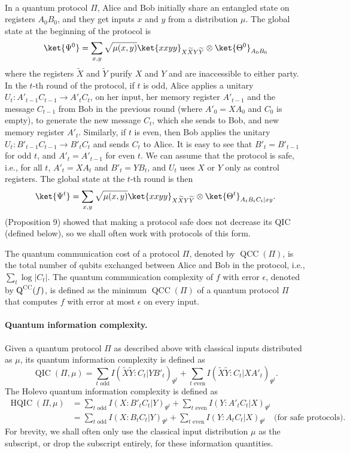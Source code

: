 \documentclass[10pt,a4paper]{article}
\theoremstyle{definition}
\newcommand{\CC}{\textsc{CC}}
\renewcommand{\>}{\rangle}
\newcommand{\<}{\langle}
\newcommand{\tX}{\widetilde{X}}
\newcommand{\tY}{\widetilde{Y}}
\DeclareMathOperator{\Q}{Q}
\DeclareMathOperator{\QCC}{QCC}
\DeclareMathOperator{\QIC}{QIC}
\DeclareMathOperator{\HQIC}{HQIC}
\begin{document}
\paragraph{} In a quantum protocol $\Pi$, Alice and Bob initially share an entangled state on registers $A_0B_0$, and they get inputs $x$ and $y$ from a distribution $\mu$. The global state at the beginning of the protocol is
\[ \ket{\Psi^0} = \sum_{x,y}\sqrt{\mu(x,y)}\ket{xxyy}_{X\tX Y\tY}\otimes\ket{\Theta^0}_{A_0B_0}\]
where the registers $\tX$ and $\tY$ purify $X$ and $Y$ and are inaccessible to either party. In the $t$-th round of the protocol, if $t$ is odd, Alice applies a unitary $U_t: A'_{t-1}C_{t-1} \to A'_tC_t$, on her input, her memory register $A'_{t-1}$ and the message $C_{t-1}$ from Bob in the previous round (where $A'_0=XA_0$ and $C_0$ is empty), to generate the new message $C_t$, which she sends to Bob, and new memory register $A'_t$. Similarly, if $t$ is even, then Bob applies the unitary $U_t: B'_{t-1}C_{t-1} \to B'_tC_t$ and sends $C_t$ to Alice. It is easy to see that $B'_t=B'_{t-1}$ for odd $t$, and $A'_t=A'_{t-1}$ for even $t$. We can assume that the protocol is safe, i.e., for all $t$, $A'_t=XA_t$ and $B'_t = YB_t$, and $U_t$ uses $X$ or $Y$ only as control registers. The global state at the $t$-th round is then
\[ \ket{\Psi^t} = \sum_{x,y}\sqrt{\mu(x,y)}\ket{xxyy}_{X\tX Y\tY}\otimes\ket{\Theta^t}_{A_tB_tC_t|xy}.\]
\cite{LT17} (Proposition 9) showed that making a protocol safe does not decrease its QIC (defined below), so we shall often work with protocols of this form.

The quantum communication cost of a protocol $\Pi$, denoted by $\QCC(\Pi)$, is the total number of qubits exchanged between Alice and Bob in the protocol, i.e., $\sum_t\log|C_t|$. The quantum communication complexity of $f$ with error $\epsilon$, denoted by $\Q^\CC(f)$, is defined as the minimum $\QCC(\Pi)$ of a quantum protocol $\Pi$ that computes $f$ with error at most $\epsilon$ on every input.

\paragraph{Quantum information complexity.} Given a quantum protocol $\Pi$ as described above with classical inputs distributed as $\mu$, its quantum information complexity is defined as
\[ \QIC(\Pi,\mu) = \sum_{t \text{ odd}}I(\tX\tY:C_t|YB'_t)_{\Psi^t} + \sum_{t\text{ even}}I(\tX\tY:C_t|XA'_t)_{\Psi^t}.\]
The Holevo quantum information complexity is defined as
\begin{align*}
\HQIC(\Pi,\mu) & = \sum_{t\text{ odd}}I(X:B'_tC_t|Y)_{\Psi^t} + \sum_{t\text{ even}}I(Y:A'_tC_t|X)_{\Psi^t} \\
 & = \sum_{t\text{ odd}}I(X:B_tC_t|Y)_{\Psi^t} + \sum_{t\text{ even}}I(Y:A_tC_t|X)_{\Psi^t} \quad \text{(for safe protocols).}
\end{align*}
For brevity, we shall often only use the classical input distribution $\mu$ as the subscript, or drop the subscript entirely, for these information quantities.
\end{document}
